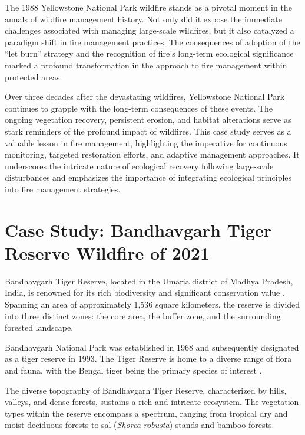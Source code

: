 \documentclass[
  12 pt,
]{Nemilov}
\begin{document}
The 1988 Yellowstone National Park wildfire stands as a pivotal moment in the annals of wildfire management history. Not only did it expose the immediate challenges associated with managing large-scale wildfires, but it also catalyzed a paradigm shift in fire management practices. The consequences of adoption of the ``let burn'' strategy and the recognition of fire's long-term ecological significance marked a profound transformation in the approach to fire management within protected areas.

Over three decades after the devastating wildfires, Yellowstone National Park continues to grapple with the long-term consequences of these events. The ongoing vegetation recovery, persistent erosion, and habitat alterations serve as stark reminders of the profound impact of wildfires. This case study serves as a valuable lesson in fire management, highlighting the imperative for continuous monitoring, targeted restoration efforts, and adaptive management approaches. It underscores the intricate nature of ecological recovery following large-scale disturbances and emphasizes the importance of integrating ecological principles into fire management strategies.

\section{Case Study: Bandhavgarh Tiger Reserve Wildfire of 2021}\label{case-study-bandhavgarh-tiger-reserve-wildfire-of-2021}

Bandhavgarh Tiger Reserve, located in the Umaria district of Madhya Pradesh, India, is renowned for its rich biodiversity and significant conservation value \citep{kishnani2019sustainable}. Spanning an area of approximately 1,536 square kilometers, the reserve is divided into three distinct zones: the core area, the buffer zone, and the surrounding forested landscape.

Bandhavgarh National Park was established in 1968 and subsequently designated as a tiger reserve in 1993. The Tiger Reserve is home to a diverse range of flora and fauna, with the Bengal tiger being the primary species of interest \citep{chandrafaunal, dubey2021avian}.

The diverse topography of Bandhavgarh Tiger Reserve, characterized by hills, valleys, and dense forests, sustains a rich and intricate ecosystem. The vegetation types within the reserve encompass a spectrum, ranging from tropical dry and moist deciduous forests to sal (\emph{Shorea robusta}) stands and bamboo forests.
\end{document}
